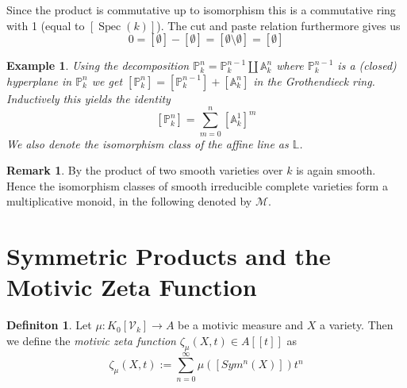 \documentclass[11pt, a4paper, german]{article}
\theoremstyle{plain}
\newtheorem{example}[theorem]{Example}
\theoremstyle{definition}
\newtheorem{definition}[theorem]{Definiton}
\newtheorem{remark}[theorem]{Remark}
\newcommand{\gring}[1][k]{K_0[\mathcal{V}_#1]}
\DeclareMathOperator{\spec}{Spec}
\begin{document}
Since the product is commutative up to isomorphism this is a commutative ring with 1 (equal to $[\spec(k)]$). 
The cut and paste relation furthermore gives us
\[
    0 = [\emptyset] - [\emptyset] = [\emptyset \setminus \emptyset] = [\emptyset]
\]

\begin{example}
    \label{projSum}
    Using the decomposition $\mathbb{P}_k^n = \mathbb{P}_k^{n-1} \coprod \mathbb{A}_k^n$ where $\mathbb{P}_k^{n-1}$ is a (closed) hyperplane
    in $\mathbb{P}_k^n$  we get $[\mathbb{P}_k^n] = [\mathbb{P}_k^{n-1}] + [\mathbb{A}_k^n]$ in the Grothendieck ring.
    Inductively this yields the identity 
    \[
        [\mathbb{P}_k^n] = \sum_{m=0}^n [\mathbb{A}_k^1]^m
    \]
    We also denote the isomorphism class of the affine line as $\mathbb{L}$.
\end{example}

\begin{remark}
    By \cite[Proposition 10.1 (d)]{Ha} the product of two smooth varieties over $k$ is again smooth. Hence the isomorphism classes of smooth
    irreducible complete varieties form a multiplicative monoid, in the following denoted by $\mathcal{M}$.
\end{remark}


\section{Symmetric Products and the Motivic Zeta Function}

\begin{definition}
    Let $\mu: \gring \to A$ be a motivic measure and $X$ a variety. Then we define the \emph{motivic zeta function} 
    $\zeta_{\mu}(X,t) \in A[[t]]$ as
    \[
        \zeta_{\mu}(X,t) := \sum_{n=0}^\infty \mu([Sym^n(X)])t^n
    \]
\end{definition}
\end{document}
